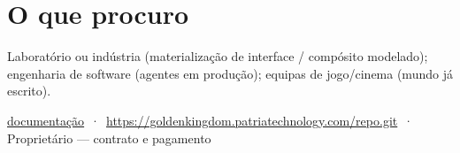 \documentclass[10pt,a4paper]{article}
\begin{document}
\section*{O que procuro}

Laboratório ou indústria (materialização de interface / compósito modelado);
engenharia de software (agentes em produção); equipas de jogo/cinema (mundo já escrito).

\smallskip
\begin{center}\footnotesize
\href{https://goldenkingdom.patriatechnology.com/docs/}{documentação}
\,·\,
\href{https://goldenkingdom.patriatechnology.com/repo.git}{https://goldenkingdom.patriatechnology.com/repo.git}
\,·\,
Proprietário — contrato e pagamento
\end{center}
\end{document}
